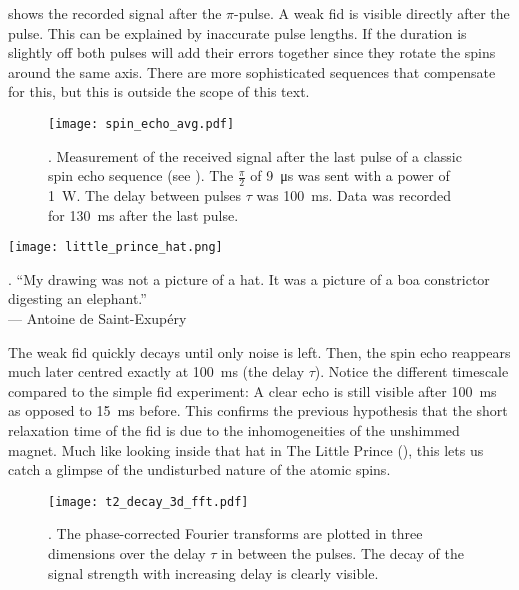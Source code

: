  shows the recorded signal after the \(\pi\)-pulse. A weak \acrshort{fid} is visible directly after the pulse. This can be explained by inaccurate pulse lengths. If the duration is slightly off both pulses will add their errors together since they rotate the spins around the same axis. There are more sophisticated sequences that compensate for this, but this is outside the scope of this text.

\begin{figure}[h!bt]
    \centering
    \texttt{[image: spin\_echo\_avg.pdf]}
    \caption{. Measurement of the received signal after the last pulse of a classic spin echo sequence (see ). The \(\frac{\pi}{2}\) of \qty{9}{\micro\second} was sent with a power of \qty{1}{\watt}. The delay between pulses \(\tau\) was \qty{100}{\milli\second}. Data was recorded for \qty{130}{\milli\second} after the last pulse.}
\end{figure}

\begin{marginfigure}
    \centering
    \texttt{[image: little\_prince\_hat.png]}
    \caption{. \enquote{My drawing was not a picture of a hat. It was a picture of a boa constrictor digesting an elephant.}\\
        --- Antoine de Saint-Exupéry}
\end{marginfigure}

The weak \acrshort{fid} quickly decays until only noise is left. Then, the spin echo reappears much later centred exactly at \qty{100}{\milli\second} (the delay \(\tau\)). Notice the different timescale compared to the simple \acrshort{fid} experiment: A clear echo is still visible after \qty{100}{\milli\second} as opposed to \approx{}\qty{15}{\milli\second} before. This confirms the previous hypothesis that the short relaxation time of the \acrshort{fid} is due to the inhomogeneities of the unshimmed magnet. Much like looking inside that hat in The Little Prince (), this lets us catch a glimpse of the undisturbed nature of the atomic spins.

\begin{figure}[h!bt]
    \centering
    \texttt{[image: t2\_decay\_3d\_fft.pdf]}
    \caption{. The phase-corrected Fourier transforms are plotted in three dimensions over the delay \(\tau\) in between the pulses. The decay of the signal strength with increasing delay is clearly visible.}
\end{figure}

